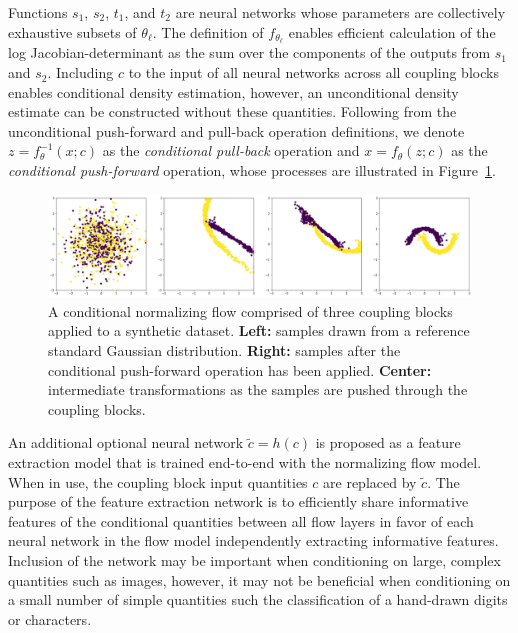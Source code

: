 Functions $s_1$, $s_2$, $t_1$, and $t_2$ are neural networks whose parameters are collectively exhaustive subsets of
$\theta_\ell$.
The definition of $f_{\theta_\ell}$ enables efficient calculation of the log Jacobian-determinant as the
sum over the components of the outputs from $s_1$ and $s_2$.
Including $c$ to the input of all neural networks across all coupling blocks enables conditional
density estimation, however, an unconditional density estimate can be constructed without these quantities.
Following from the unconditional push-forward and pull-back operation definitions, we denote $z = f_\theta^{-1}(x; c)$
as the \textit{conditional pull-back} operation and $x = f_\theta(z; c)$ as the \textit{conditional push-forward}
operation, whose processes are illustrated in Figure~\ref{fig:moon_flows}.

\begin{figure}[htbp]
    \caption[Conditional normalizing flow density estimation on synthetic data]{
        A conditional normalizing flow comprised of three coupling blocks applied to a synthetic dataset.
        \textbf{Left:} samples drawn from a reference standard Gaussian distribution.
        \textbf{Right:} samples after the conditional push-forward operation has been applied.
        \textbf{Center:} intermediate transformations as the samples are pushed through the coupling blocks.
    }
    \begin{center}
        \setlength{\fboxsep}{0pt}%
        \setlength{\fboxrule}{1pt}%
        \includegraphics[width=150mm]{figs/two_moons_flow}
    \end{center}
    \label{fig:moon_flows}
\end{figure}

An additional optional neural network $\tilde{c} = h(c)$ is proposed as a feature extraction model that is trained
end-to-end with the normalizing flow model.
When in use, the coupling block input quantities $c$ are replaced by $\tilde{c}$.
The purpose of the feature extraction network is to efficiently share informative features of the
conditional quantities between all flow layers in favor of each neural network in the flow model independently
extracting informative features.
Inclusion of the network may be important when conditioning on large, complex quantities such as images, however, it
may not be beneficial when conditioning on a small number of simple quantities such the classification of a hand-drawn
digits or characters.

